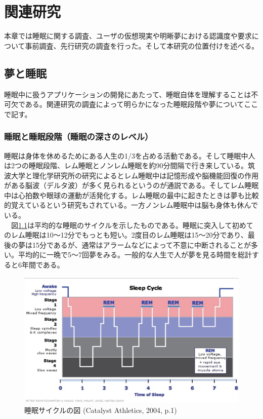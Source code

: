 \chapter{関連研究}
\label{chap:webapi}

本章では睡眠に関する調査、ユーザの仮想現実や明晰夢における認識度や要求について事前調査、先行研究の調査を行った。そして本研究の位置付けを述べる。

\section{夢と睡眠}
睡眠中に扱うアプリケーションの開発にあたって、睡眠自体を理解することは不可欠である。関連研究の調査によって明らかになった睡眠段階や夢についてここで記す。

\subsection{睡眠と睡眠段階（睡眠の深さのレベル）}
睡眠は身体を休めるためにある人生の1/3を占める活動である。そして睡眠中人は2つの睡眠段階、レム睡眠とノンレム睡眠を約90分間隔で行き来している\cite{Dement}。筑波大学と理化学研究所の研究によるとレム睡眠中は記憶形成や脳機能回復の作用がある脳波（デルタ波）が多く見られるというのが通説である\cite{tsukuba}。そしてレム睡眠中は心拍数や眼球の運動が活発化する。レム睡眠の最中に起きたときは夢も比較的覚えているという研究もされている\cite{remNonRem}。一方ノンレム睡眠中は脳も身体も休んでいる。\\
　図\ref{SleepHypnogram}は平均的な睡眠のサイクルを示したものである\cite{hypnogram}。睡眠に突入して初めてのレム睡眠は10〜12分でもっとも短い。2度目のレム睡眠は15〜20分であり、最後の夢は15分であるが、通常はアラームなどによって不意に中断されることが多い。平均的に一晩で5〜7回夢をみる。一般的な人生で人が夢を見る時間を総計すると6年間である。
\begin{figure}[htbp]
\begin{center}
\includegraphics[width=15cm]{eps/SleepHypnogram.eps}
\caption{睡眠サイクルの図 (Catalyst Athletics, 2004, p.1) }
\label{SleepHypnogram}
\end{center}
\end{figure}


